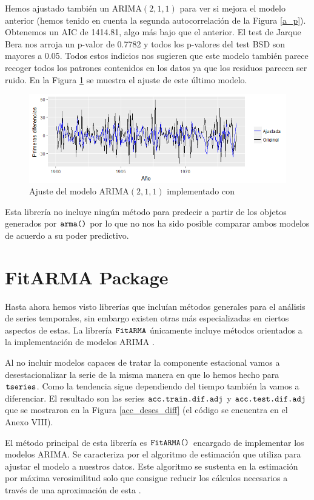Hemos ajustado también un ARIMA$(2,1,1)$ para ver si mejora el modelo anterior (hemos tenido en cuenta la segunda autocorrelación de la Figura \ref{a_p}). Obtenemos un AIC de 1414.81, algo más bajo que el anterior. El test de Jarque Bera nos arroja un p-valor de 0.7782 y todos los p-valores del test BSD son mayores a 0.05. Todos estos indicios nos sugieren que este modelo también parece recoger todos los patrones contenidos en los datos ya que los residuos parecen ser ruido. En la Figura \ref{fit_arma} se muestra el ajuste de este último modelo.
\begin{figure}
    \centering
    \centerline{\includegraphics[scale = 0.7]{Images/Modelizacion/3272.png}}
    \caption{Ajuste del modelo ARIMA$(2,1,1)$ implementado con }
    \label{fit_arma}
\end{figure}

Esta librería no incluye ningún método para predecir a partir de los objetos generados por $\verb!arma()!$ por lo que no nos ha sido posible comparar ambos modelos de acuerdo a su poder predictivo.

\section{FitARMA Package}
Hasta ahora hemos visto librerías que incluían métodos generales para el análisis de series temporales, sin embargo existen otras más especializadas en ciertos aspectos de estas. La librería $\verb!FitARMA!$ únicamente incluye métodos orientados a la implementación de modelos ARIMA \cite{fitarma}.

Al no incluir modelos capaces de tratar la componente estacional vamos a desestacionalizar la serie de la misma manera en que lo hemos hecho para $\verb!tseries!$. Como la tendencia sigue dependiendo del tiempo también la vamos a diferenciar. El resultado son las series $\verb!acc.train.dif.adj!$ y $\verb!acc.test.dif.adj!$ que se mostraron en la Figura \ref{acc_deses_diff} (el código se encuentra en el Anexo VIII).

El método principal de esta librería es $\verb!FitARMA()!$ encargado de implementar los modelos ARIMA. Se caracteriza por el algoritmo de estimación que utiliza para ajustar el modelo a nuestros datos. Este algoritmo se sustenta en la estimación por máxima verosimilitud solo que consigue reducir los cálculos necesarios a través de una aproximación de esta \cite{fitarma-algoritmo}.

